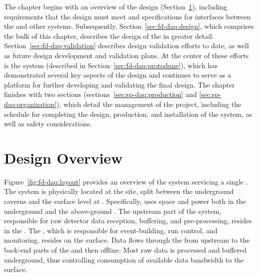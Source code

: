 The chapter begins with an overview of the  design
(Section~\ref{sec:fd-daq:overview}), including requirements that the design
must meet and specifications for interfaces between the   and other
  systems.  Subsequently,
Section~\ref{sec:fd-daq:design}, which comprises the bulk of this chapter,
describes the design of the   in greater detail.
Section~\ref{sec:fd-daq:validation} describes design validation efforts to
date, as well as future design development and validation plans. At the center of
these efforts is the    system (described in
Section~\ref{sec:fd-daq:protodune}), which has demonstrated
several key aspects of the      design and continues
to serve as a platform for further developing and validating 
the final design.  The chapter finishes with two sections
(sections~\ref{sec:sp-daq:production} and \ref{sec:sp-daq:organization}), which
detail the management of the  project, including the
schedule for completing the design,  production, and installation of the
system, as well as safety considerations.

\section{Design Overview}
\label{sec:fd-daq:overview}

Figure~\ref{fig:fd-daq:layout} provides an overview of the    system 
servicing a single 
. The system is
physically located at the  site, split between the
underground  caverns and the surface level at . Specifically,  uses space and
power both in the underground  and the above-ground .
The upstream part of the system, responsible for
raw detector data reception, buffering, and pre-processing, resides in the .
The ,
which is responsible for
event-building, run control, and monitoring, resides on the
surface.
Data flows through the  from 
upstream to the back-end parts of the  and then offline. Most raw data is processed and buffered underground, thus controlling consumption of available data bandwidth  to the surface. 


